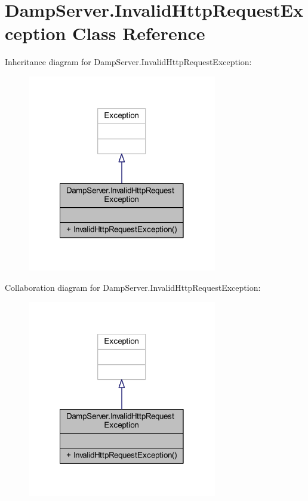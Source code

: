 \hypertarget{class_damp_server_1_1_invalid_http_request_exception}{\section{Damp\-Server.\-Invalid\-Http\-Request\-Exception Class Reference}
\label{class_damp_server_1_1_invalid_http_request_exception}
}


Inheritance diagram for Damp\-Server.\-Invalid\-Http\-Request\-Exception\-:\nopagebreak
\begin{figure}[H]
\begin{center}
\leavevmode
\includegraphics[width=234pt]{class_damp_server_1_1_invalid_http_request_exception__inherit__graph}
\end{center}
\end{figure}


Collaboration diagram for Damp\-Server.\-Invalid\-Http\-Request\-Exception\-:\nopagebreak
\begin{figure}[H]
\begin{center}
\leavevmode
\includegraphics[width=234pt]{class_damp_server_1_1_invalid_http_request_exception__coll__graph}
\end{center}
\end{figure}

